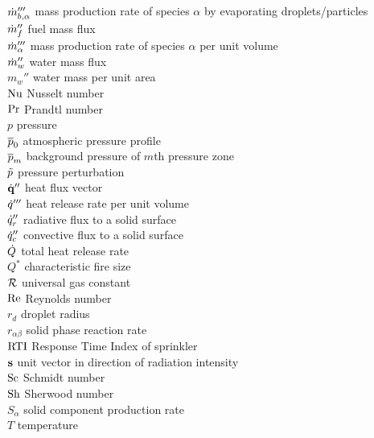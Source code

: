 \begin{tabbing}
$\dot{m}_{b,\alpha}'''$       \> mass production rate of species $\alpha$ by evaporating droplets/particles \\
$\dot{m}_f''$                 \> fuel mass flux \\
$\dot{m}_\alpha'''$           \> mass production rate of species $\alpha$ per unit volume \\
$\dot{m}_w''$                 \> water mass flux  \\
$m_w''$                   \> water mass per unit area \\
$\hbox{Nu}$                     \> Nusselt number \\
$\hbox{Pr}$                     \> Prandtl number \\
$p$                       \> pressure \\
$\overline{p}_0$                   \> atmospheric pressure profile \\
$\overline{p}_m$                   \> background pressure of $m$th pressure zone \\
$\tilde{p}$                     \> pressure perturbation \\
$\dot{\bf q}''$                  \> heat flux vector \\
$\dot{q}'''$                  \> heat release rate per unit volume \\
$\dot{q}_r''$                 \> radiative flux to a solid surface \\
$\dot{q}_c''$                 \> convective flux to a solid surface \\
$\dot{Q}$                     \> total heat release rate \\
$Q^*$                     \> characteristic fire size \\
${\cal R}$                      \> universal gas constant \\
$\hbox{Re}$                     \> Reynolds number \\
$r_d$                     \> droplet radius \\
$r_{\alpha\beta}$     \> solid phase reaction rate \\
$\hbox{RTI}$              \> Response Time Index of sprinkler \\
${\bf s}$                     \> unit vector in direction of radiation intensity\\
$\hbox{Sc}$                     \> Schmidt number \\
$\hbox{Sh}$                     \> Sherwood number \\
$S_\alpha$        \> solid component production rate \\
$T$                       \> temperature \\

\end{tabbing}
